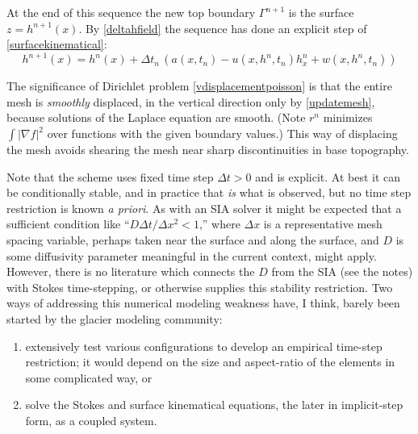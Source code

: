 \documentclass[letterpaper,final,12pt,reqno]{amsart}
\newcommand{\grad}{\nabla}
\begin{document}
\medskip
At the end of this sequence the new top boundary $\Gamma^{n+1}$ is the surface $z=h^{n+1}(x)$.  By \eqref{deltahfield} the sequence has done an explicit step of \eqref{surfacekinematical}:
    $$h^{n+1}(x) = h^n(x) + \Delta t_n\,\left(a(x,t_n) - u(x,h^n,t_n) h_x^n + w(x,h^n,t_n)\right)$$

The significance of Dirichlet problem \eqref{vdisplacementpoisson} is that the entire mesh is \emph{smoothly} displaced, in the vertical direction only by \eqref{updatemesh}, because solutions of the Laplace equation are smooth.  (Note $r^n$ minimizes $\int |\grad f|^2$ over functions with the given boundary values.)  This way of displacing the mesh avoids shearing the mesh near sharp discontinuities in base topography.

Note that the scheme uses fixed time step $\Delta t > 0$ and is explicit.  At best it can be conditionally stable, and in practice that \emph{is} what is observed, but no time step restriction is known \emph{a priori}.  As with an SIA solver it might be expected that a sufficient condition like ``$D\Delta t / \Delta x^2 < 1$,'' where $\Delta x$ is a representative mesh spacing variable, perhaps taken near the surface and along the surface, and $D$ is some diffusivity parameter meaningful in the current context, might apply.  However, there is no literature which connects the $D$ from the SIA (see the notes) with Stokes time-stepping, or otherwise supplies this stability restriction.  Two ways of addressing this numerical modeling weakness have, I think, barely been started by the glacier modeling community:
\renewcommand{\labelenumi}{(\roman{enumi})}
\begin{enumerate}
\item extensively test various configurations to develop an empirical time-step restriction; it would depend on the size and aspect-ratio of the elements in some complicated way, or
\item solve the Stokes and surface kinematical equations, the later in implicit-step form, as a coupled system.
\end{enumerate}


\small

\bigskip


\end{document}

